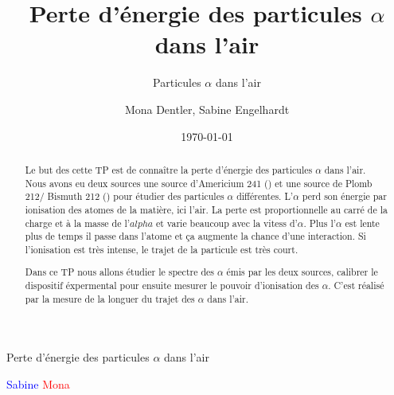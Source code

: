 \documentclass[a4paper,11pt]{scrartcl}
\title{Perte d'énergie des particules $\alpha$ dans l'air}
\subtitle{Particules $\alpha$ dans l'air}
\author{Mona Dentler, Sabine Engelhardt}
\date{\today}
\begin{document}
 \pagestyle{empty}
 \begin{center}
  \makeatletter
  \@subject
  \vspace{2cm}

  \Huge
  Perte d'énergie des particules $\alpha$ dans l'air\newline
  \vspace{1cm}
  \Large


  \@author
  \newline
  \@publishers


  \@date
  \makeatother
 \end{center}
 \vfill

 \textcolor{blue}{Sabine}
 \textcolor{red}{Mona}

 \begin{abstract}
  Le but des cette TP est de connaître la perte d'énergie des particules $\alpha$ dans l'air. Nous avons eu deux sources une source d'Americium 241 () et une source de Plomb 212/ Bismuth 212 () pour étudier des particules $\alpha$ différentes. L'$\alpha$ perd son énergie par ionisation des atomes de la matière, ici l'air. La perte est proportionnelle au carré de la charge et à la masse de l'$alpha$ et varie beaucoup avec la vitess d'$\alpha$. Plus l'$\alpha$ est lente plus de temps il passe dans l'atome et \c ca augmente la chance d'une interaction. Si l'ionisation est très intense, le trajet de la particule est très court.

  Dans ce TP nous allons étudier le spectre des $\alpha$ émis par les deux sources, calibrer le dispositif éxpermental pour ensuite mesurer le pouvoir d'ionisation des $\alpha$. C'est réalisé par la mesure de la longuer du trajet des $\alpha$ dans l'air.
 \end{abstract}
\newpage
 \pagestyle{scrheadings}
 \tableofcontents
\newpage
\end{document}
